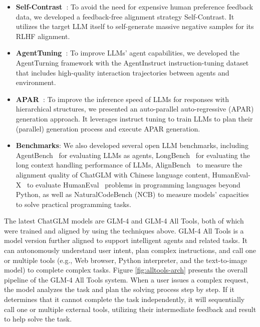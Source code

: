 \begin{itemize}[leftmargin=*,itemsep=0pt,parsep=0.2em,topsep=0.0em,partopsep=0.0em]
\item \textbf{Self-Contrast~\cite{liu2024selfcontrast}}: 
To avoid the need for expensive human preference feedback data, we developed a feedback-free alignment strategy Self-Contrast. 
It utilizes the target LLM itself to self-generate massive negative samples for its RLHF alignment. 

\item \textbf{AgentTuning~\cite{zeng2023agenttuning}}: 
To improve LLMs' agent capabilities, we developed the AgentTurning framework with the  AgentInstruct instruction-tuning dataset that includes high-quality interaction trajectories between agents and environment. 

\item \textbf{APAR~\cite{Liu2024APAR}}: 
To improve the inference speed of LLMs for responses with hierarchical structures, we presented an auto-parallel auto-regressive (APAR) generation approach. 
It leverages instruct tuning to train LLMs to plan their (parallel) generation process and execute APAR generation. 

\item \textbf{Benchmarks}: 
We also developed several open LLM benchmarks, including 
AgentBench~\cite{liu2023agentbench} for evaluating LLMs as agents, 
LongBench~\cite{bai2023longbench} for evaluating the long context handling performance of LLMs, 
AlignBench~\cite{bai2024longalign} to measure the alignment quality of ChatGLM with Chinese language content, 
HumanEval-X~\cite{zheng2023codegeex} to evaluate HumanEval~\cite{Humaneval:abs-2107-03374} problems in programming languages beyond Python, 
as well as 
NaturalCodeBench (NCB) to measure models' capacities to solve practical programming tasks. 

\end{itemize}




The latest ChatGLM models are GLM-4 and GLM-4 All Tools, both of which were trained and aligned by using the techniques above. 
GLM-4 All Tools is a model version further aligned to support intelligent agents and related tasks. 
It can autonomously understand user intent, plan complex instructions, and call one or multiple tools (e.g., Web browser, Python interpreter, and the text-to-image model) to complete complex tasks. 
Figure \ref{fig:alltools-arch} presents the overall pipeline of the GLM-4 All Tools system. 
When a user issues a complex request, the model analyzes the task and plan the solving process step by step. 
If it determines that it cannot complete the task independently, it will sequentially call one or multiple external tools, utilizing their intermediate feedback and result to help solve the task.   

